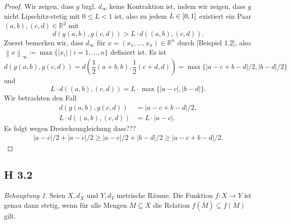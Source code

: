 \documentclass[draft,a5paper]{article}
\theoremstyle{remark}
\newtheorem*{beh}{Behauptung}
\newcommand{\interval}[1]{\mathinner{#1}}
\newcommand{\envert}[1]{\left\lvert#1\right\rvert}
\newcommand{\enVert}[1]{\left\lVert#1\right\rVert}
\begin{document}
\begin{proof}
  Wir zeigen, dass \(g\) bzgl. \(d_{\infty}\) keine Kontraktion ist, indem
  wir zeigen, dass \(g\) nicht Lipschitz-stetig mit \(0 \le L < 1\) ist,
  also zu jedem \(L \in \interval{[0, 1[}\) existiert ein Paar \((a, b),
  (c, d) \in \mathbb{R}^{2}\) mit
  \[
    d(g(a, b), g(c, d)) > L \cdot d((a, b), (c, d)).
  \]
  Zuerst bemerken wir, dass \(d_{\infty}\) für
  \(x = (x_{1}, \ldots, x_{n}) \in \mathbb{R}^{n}\) durch [Beispiel 1.2], also
  \( \enVert{x}_{\infty} \coloneq \max\{\envert{x_{i}} \mid i = 1, \ldots, n \} \)
  definiert ist. Es ist
  \[
    d(g(a, b), g(c, d))
    = d\left(\frac{1}{2}(a+b, b), \frac{1}{2}(c+d, d)\right)
    = \max\{\envert{a-c + b-d}/2, \envert{b-d}/2 \}
  \]
  und
  \[
    L \cdot d((a, b), (c, d))
    = L \cdot \max\{\envert{a-c}, \envert{b-d} \}.
  \]
  Wir betrachten den Fall
  \begin{align*}
    d(g(a, b), g(c, d)) &= \envert{a-c + b-d}/2, \\
    L \cdot d((a, b), (c, d)) &= L \cdot \envert{a-c}.
  \end{align*}
  Es folgt wegen Dreiecksungleichung dass???
  \begin{align*}
    \envert{a-c}/2 + \envert{a-c}/2 \ge \envert{a-c}/2 + \envert{b-d}/2
    \ge \envert{a-c+b-d}/2.
  \end{align*}
\end{proof}

\subsection*{H 3.2}

\begin{beh}
  Seien \(X, d_{X}\) und \(Y, d_{Y}\) metrische Räume.  Die Funktion
  \(f\colon X \to Y\) ist genau dann stetig, wenn für alle Mengen \(M \subseteq X\)
  die Relation \(f(\overline{M}) \subseteq \overline{f(M)}\) gilt.
\end{beh}
\end{document}
